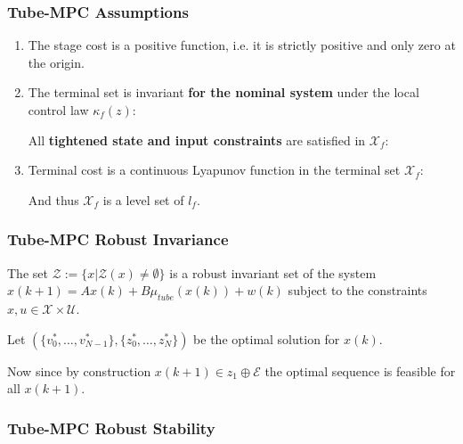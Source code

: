 \documentclass[8pt,a4paper]{scrartcl}
\begin{document}
\begin{multicols*}{3}
\subsubsection{Tube-MPC Assumptions}

\begin{enumerate}
\ncompaq
\item The stage cost is a positive function, i.e. it is strictly positive and only zero at the origin.
\item The terminal set is invariant \textbf{for the nominal system }under the local control law $\kappa_f(z):$


All \textbf{tightened state and input constraints } are satisfied in $\mathcal{X}_f$:


\item Terminal cost is a continuous Lyapunov function in the terminal set $\mathcal{X}_f$:


And thus $\mathcal{X}_f$ is a level set of $l_f$.
\end{enumerate}

\subsubsection{Tube-MPC Robust Invariance}

The set $\mathcal{Z}:=\{x|\mathcal{Z}(x)\neq\emptyset\}$ is a robust invariant set of the system $x(k+1)=Ax(k)+B\mu_{tube}(x(k))+w(k)$ subject to the constraints $x,u\in\mathcal{X}\times\mathcal{U}$.

\finn

Let $(\{v_0^\ast,\ldots,v_{N-1}^\ast\},\{z_0^\ast,\ldots,z_N^\ast\})$ be the optimal solution for $x(k)$.

\finn

Now since by construction $x(k+1)\in z_1\oplus\mathcal{E}$ the optimal sequence is feasible for all $x(k+1)$.

\subsubsection{Tube-MPC Robust Stability}


\end{multicols*}
\end{document}
